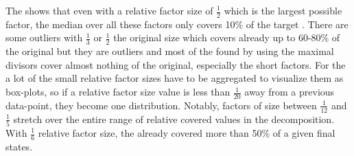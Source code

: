 The \orDecomp shows that even with a relative factor size of $\frac{1}{2}$ which is the largest possible factor, the median over all these factors only covers 10\% of the target \DFA.
There are some outliers with $\frac{1}{3}$ or $\frac{1}{2}$ the original size which covers already up to 60-80\% of the original \DFA but they are outliers and most of the \orDecomp found by using the maximal divisors cover almost nothing of the original, especially the short factors.
For the \andDecomp a lot of the small relative factor sizes have to be aggregated to visualize them as box-plots, so if a relative factor size value is less than $\frac{1}{20}$ away from a previous data-point, they become one distribution.
Notably, factors of size between $\frac{1}{12}$ and $\frac{1}{5}$ stretch over the entire range of relative covered values in the decomposition. With $\frac{1}{6}$ relative factor size, the \andDecomp already covered more than 50\% of a given \DFAs final states.


